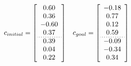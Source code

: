 \begin{equation}
  \label{eq:rrt_prm_static_obs_pose_vector}
  \centering
  \begin{array}{cc}
    c_{initial}=
    \left[\begin{array}{c}
      0.60 \\
      0.36 \\
      -0.60\\
      0.37\\ \hdashline[1pt/2pt]
      0.39 \\
      0.04 \\
      0.22

    \end{array}\right] &
    c_{goal}=
    \left[\begin{array}{c}
      -0.18 \\
      0.77 \\
      0.12 \\
      0.59 \\ \hdashline[1pt/2pt]
      -0.09 \\
      -0.34 \\
      0.34
    \end{array}\right]
  \end{array}
\end{equation}
